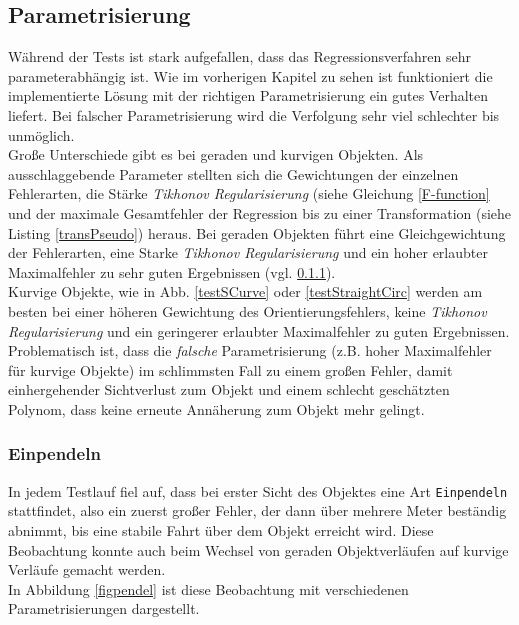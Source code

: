 \subsection{Parametrisierung}
Während der Tests ist stark aufgefallen, dass das Regressionsverfahren sehr parameterabhängig ist. Wie im vorherigen Kapitel zu sehen ist funktioniert die implementierte Lösung mit der richtigen Parametrisierung ein gutes Verhalten liefert. 
Bei falscher Parametrisierung wird die Verfolgung sehr viel schlechter bis unmöglich.\\
Große Unterschiede gibt es bei geraden und kurvigen Objekten. Als ausschlaggebende Parameter stellten sich die Gewichtungen der einzelnen Fehlerarten, die Stärke \textit{Tikhonov Regularisierung} (siehe Gleichung \ref{F-function} und der maximale Gesamtfehler der Regression bis zu einer Transformation (siehe Listing \ref{transPseudo}) heraus.
Bei geraden Objekten führt eine Gleichgewichtung der Fehlerarten, eine Starke \textit{Tikhonov Regularisierung} und ein hoher erlaubter Maximalfehler zu sehr guten Ergebnissen (vgl. \ref{sec_pendel}).\\
Kurvige Objekte, wie in Abb. \ref{testSCurve} oder \ref{testStraightCirc} werden am besten bei einer höheren Gewichtung des Orientierungsfehlers, keine \textit{Tikhonov Regularisierung} und ein geringerer erlaubter Maximalfehler zu guten Ergebnissen.
Problematisch ist, dass die \textit{falsche} Parametrisierung (z.B. hoher Maximalfehler für kurvige Objekte) im schlimmsten Fall zu einem großen Fehler, damit einhergehender Sichtverlust zum Objekt und einem schlecht geschätzten Polynom, dass keine erneute Annäherung zum Objekt mehr gelingt.

\subsubsection{Einpendeln}
\label{sec_pendel}
In jedem Testlauf fiel auf, dass bei erster Sicht des Objektes eine Art \texttt{Einpendeln} stattfindet, also ein zuerst großer Fehler, der dann über mehrere Meter beständig abnimmt, bis eine stabile Fahrt über dem Objekt erreicht wird. Diese Beobachtung konnte auch beim Wechsel von geraden Objektverläufen auf kurvige Verläufe gemacht werden.\\
In Abbildung \ref{figpendel} ist diese Beobachtung mit verschiedenen Parametrisierungen dargestellt.

